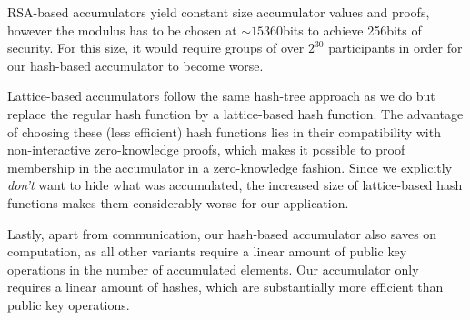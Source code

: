 RSA-based accumulators yield constant size accumulator values and proofs, however the modulus has to be chosen at
$\sim15360$bits to achieve 256bits of security. For this size, it would require groups of over $2^{30}$ participants in
order for our hash-based accumulator to become worse.

Lattice-based accumulators \cite{EC:LLNW16, ACISP:YAYLX18} follow the same hash-tree approach as we do but replace the
regular hash function by a lattice-based hash function. The advantage of choosing these (less efficient) hash functions
lies in their compatibility with non-interactive zero-knowledge proofs, which makes it possible to proof membership in
the accumulator in a zero-knowledge fashion. Since we explicitly \emph{don't} want to hide what was accumulated, the
increased size of lattice-based hash functions makes them considerably worse for our application.

Lastly, apart from communication, our hash-based accumulator also saves on computation, as all other variants require
a linear amount of public key operations in the number of accumulated elements. Our accumulator only requires a
linear amount of hashes, which are substantially more efficient than public key operations.
